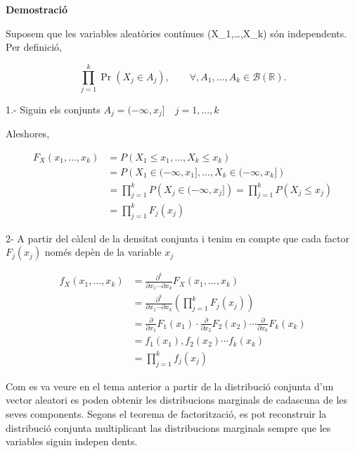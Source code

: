 \documentclass[
  catalan,
]{article}
\theoremstyle{definition}
\theoremstyle{definition}
\theoremstyle{definition}
\theoremstyle{definition}
\theoremstyle{remark}
\begin{document}
\textbf{Demostració}

Suposem que les variables aleatòries contínues (X\_1,\ldots,X\_k) són independents. Per definició,

\[
\prod_{j=1}^{k}\Pr(X_j\in A_j),
\qquad
\forall,A_1,\ldots,A_k\in\mathcal{B}(\mathbb{R}).
\]

1.- Siguin els conjunts \(A_j=(-\infty ,x_j] \quad j=1,...,k\)

Aleshores,

\[
\begin{aligned}
F_X(x_1,\ldots,x_k)&=P(X_1\le x_1,\ldots,X_k\le x_k) \\
&=P\left(X_1\in(-\infty,x_1],\ldots,
X_k\in(-\infty,x_k]\right) \\
&=\prod_{j=1}^{k}
P \left(X_j\in(-\infty,x_j]\right)
=\prod_{j=1}^{k}
P(X_j\le x_j) \\
&=\prod_{j=1}^{k}
F_j(x_j)
\end{aligned}
\]

2- A partir del càlcul de la densitat conjunta i tenim en compte que cada factor \(F_j(x_j)\) només depèn de la variable \(x_j\)

\[ 
\begin{aligned}
f_X(x_1,...,x_k)&= \frac{\partial^k}
{\partial x_1\cdots\partial x_k} 
F_X(x_1,\ldots,x_k) \\
&=\frac{\partial^k} {\partial x_1\cdots\partial x_k}(\prod_{j=1}^{k}
F_j(x_j)) \\
&=
\frac{\partial}{\partial x_1}F_1(x_1)
\cdot
\frac{\partial}{\partial x_2}F_2(x_2)
\cdots
\frac{\partial}{\partial x_k}F_k(x_k) \\
&=
f_1(x_1),
f_2(x_2)\cdots
f_k(x_k) \\ 
&=\prod_{j=1}^{k}f_j(x_j)
\end{aligned}
\]

Com es va veure en el tema anterior a partir de la distribució conjunta d'un vector aleatori es poden obtenir les distribucions marginals de cadascuna de les seves components. Segons el teorema de factorització, es pot reconstruir la distribució conjunta multiplicant las distribucions marginals sempre que les variables siguin indepen dents.
\end{document}
